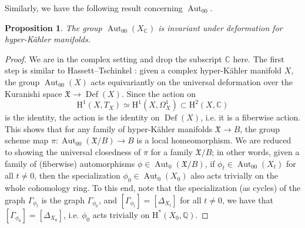 \documentclass[11pt,reqno,oneside]{amsart}
\numberwithin{equation}{section}
\newtheorem{proposition}[theorem]{Proposition}
\theoremstyle{definition}
\DeclareMathOperator{\Aut}{Aut}
\newcommand\rH{\mathrm{H}}
\newcommand{\CC}{\mathbb{C}}
\newcommand{\QQ}{\mathbb{Q}}
\begin{document}
Similarly, we have the following result concerning $\Aut_{00}$. 
\begin{proposition}
\label{prop:Aut00}
 The group $\Aut_{00}(X_\CC)$ is invariant under deformation for hyper-Kähler manifolds.
\end{proposition}
\begin{proof}
We are in the complex setting and drop the subscript $\CC$ here. 
The first step is similar to Hassett--Tschinkel \cite[Theorem 2.1]{HT13}: given a complex hyper-Kähler manifold $X$, the group $\Aut_{00}(X)$ acts equivariantly on the universal deformation over the Kuranishi space $\mathfrak{X}\to \operatorname{Def}(X)$. Since the action on $$\rH^1(X, T_X)\simeq \rH^1(X, \Omega_X^1)\subset \rH^2(X, \CC)$$ is the identity, the action is the identity on $\operatorname{Def}(X)$, i.e. it is a fiberwise action. This shows that for any family of hyper-Kähler manifolds $\mathfrak{X}\to B$, the group scheme map $\pi\colon \Aut_{00}(\mathfrak{X}/B)\to B$ is a local homeomorphism. We are reduced to showing the universal closedness of $\pi$ for a family $\mathfrak{X}/B$; in other words, given a family of (fiberwise) automorphisms $\phi\in \Aut_0(\mathfrak{X}/B)$, if $\phi_t\in \Aut_{00}(X_t)$ for all $t\neq 0$, then the specialization $\phi_0\in \Aut_0(X_0)$ also acts trivially on the whole cohomology ring. To this end, note that the specialization (as cycles) of the graph $\Gamma_{\phi_t}$ is the graph $\Gamma_{\phi_0}$, and $[\Gamma_{\phi_t}]=[\Delta_{X_t}]$ for all $t\neq 0$, we have that $[\Gamma_{\phi_0}]=[\Delta_{X_0}]$, i.e. $\phi_0$ acts trivially on $\rH^*(X_0, \QQ)$.
\end{proof}
\end{document}
